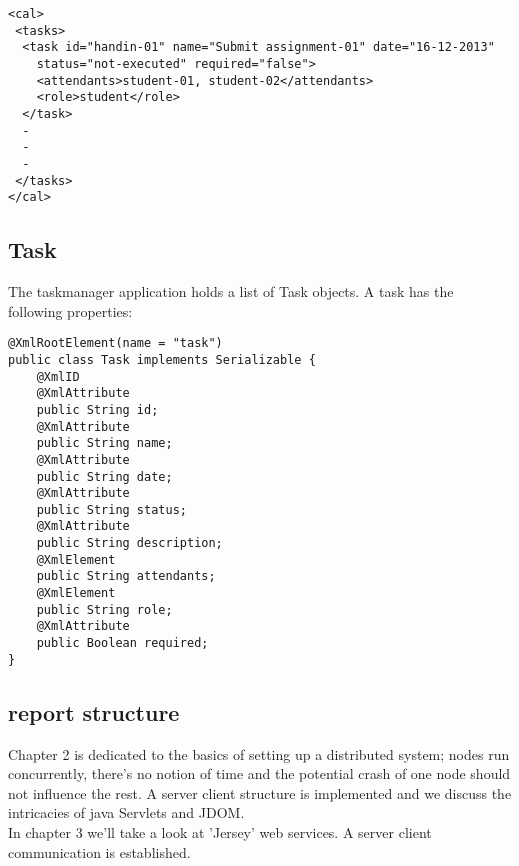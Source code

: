 \begin{lstlisting}[caption = taskmanager.xml]
<cal>
 <tasks>
  <task id="handin-01" name="Submit assignment-01" date="16-12-2013"
	status="not-executed" required="false">
	<attendants>student-01, student-02</attendants>
	<role>student</role>	
  </task>
  - 
  - 
  - 
 </tasks>
</cal>
\end{lstlisting}

\subsection{Task}
The taskmanager application holds a list of Task objects. A task has the following properties:\\

\begin{comment}
ID (a unique identifier), name (the name of the task), date (the date of creation), status (status of the task. E.g executed or non-executed.),
required (E.g. ‘true’ or ‘false’.’), role (role, is an access control technique in where the role of a task signifies the access rights level of that task. ), Attendants (a list of attendants for the task)\\
\end{comment}


\begin{lstlisting}[caption=Task]
@XmlRootElement(name = "task")
public class Task implements Serializable {
    @XmlID
    @XmlAttribute
    public String id;
    @XmlAttribute
    public String name;
    @XmlAttribute
    public String date;
    @XmlAttribute
    public String status;
    @XmlAttribute
    public String description;
    @XmlElement
    public String attendants;
    @XmlElement
    public String role;
    @XmlAttribute
    public Boolean required;
}

\end{lstlisting}

\subsection{report structure}

Chapter 2 is dedicated to the basics of setting up a distributed system; nodes run concurrently, there’s no notion of time and the potential crash of one node should not influence the rest. A server client structure is implemented and we discuss the intricacies of java Servlets and JDOM. \\	

In chapter 3 we'll take a look at 'Jersey' web services. A server client communication is established. \\

